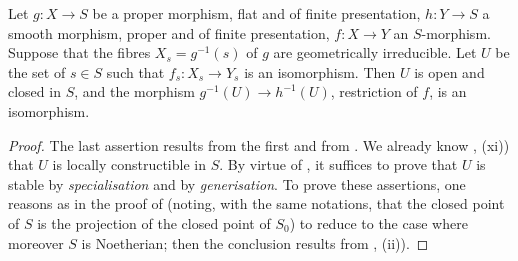 \begin{corollary}[21.12.16]
\label{IV.21.12.16}
Let $g:X\to S$ be a proper morphism, flat and of finite presentation, $h:Y\to S$ a smooth morphism, proper and of finite presentation, $f:X\to Y$ an $S$-morphism.
Suppose that the fibres $X_s=g^{-1}(s)$ of $g$ are geometrically irreducible.
Let $U$ be the set of $s\in S$ such that $f_s:X_s\to Y_s$ is an isomorphism.
Then $U$ is open and closed in $S$, and the morphism $g^{-1}(U)\to h^{-1}(U)$, restriction of $f$, is an isomorphism.
\end{corollary}

\begin{proof}
The last assertion results from the first and from .
We already know , (xi)) that $U$ is locally constructible in $S$.
By virtue of , it suffices to prove that $U$ is stable by \emph{specialisation} and by \emph{generisation}.
To prove these assertions, one reasons as in the proof of  (noting, with the same notations, that the closed point of $S$ is the projection of the closed point of $S_0$) to reduce to the case where moreover $S$ is Noetherian; then the conclusion results from , (ii)).
\end{proof}


